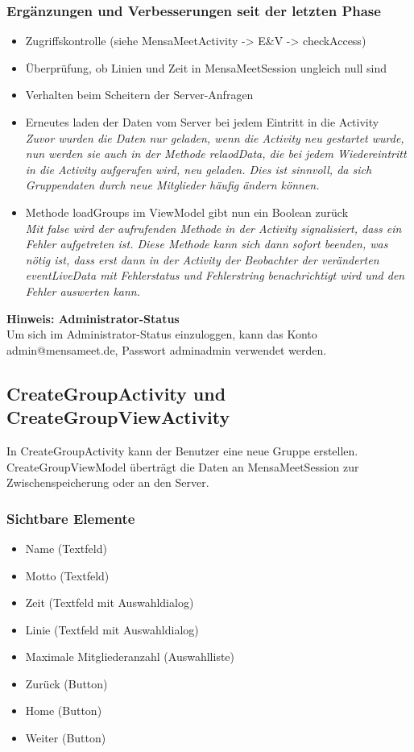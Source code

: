 \documentclass[a4paper]{scrreprt}
\begin{document}
\subsubsection{Ergänzungen und Verbesserungen seit der letzten Phase}
\begin{itemize}
\item Zugriffskontrolle (siehe MensaMeetActivity -> E\&V -> checkAccess)
\item Überprüfung, ob Linien und Zeit in MensaMeetSession ungleich null sind
\item Verhalten beim Scheitern der Server-Anfragen
\item Erneutes laden der Daten vom Server bei jedem Eintritt in die Activity\\
\textit{Zuvor wurden die Daten nur geladen, wenn die Activity neu gestartet wurde, nun werden sie auch in der Methode relaodData, die bei jedem Wiedereintritt in die Activity aufgerufen wird, neu geladen. Dies ist sinnvoll, da sich Gruppendaten durch neue Mitglieder häufig ändern können.}
\item Methode loadGroups im ViewModel gibt nun ein Boolean zurück \\
\textit{Mit false wird der aufrufenden Methode in der Activity signalisiert, dass ein Fehler aufgetreten ist. Diese Methode kann sich dann sofort beenden, was nötig ist, dass erst dann in der Activity der Beobachter der veränderten eventLiveData mit Fehlerstatus und Fehlerstring benachrichtigt wird und den Fehler auswerten kann.} \\
\end{itemize}

\textbf{Hinweis: Administrator-Status} \\
Um sich im Administrator-Status einzuloggen, kann das Konto admin@mensameet.de, Passwort adminadmin verwendet werden.  

\subsection{CreateGroupActivity und CreateGroupViewActivity}
In CreateGroupActivity kann der Benutzer eine neue Gruppe erstellen. CreateGroupViewModel überträgt die Daten an MensaMeetSession zur Zwischenspeicherung oder an den Server.



\subsubsection{Sichtbare Elemente}
\begin{itemize}
\item Name (Textfeld)
\item Motto (Textfeld)
\item Zeit (Textfeld mit Auswahldialog)
\item Linie (Textfeld mit Auswahldialog)
\item Maximale Mitgliederanzahl (Auswahlliste)
\item Zurück (Button)
\item Home (Button)
\item Weiter (Button)
\end{itemize}
\end{document}
